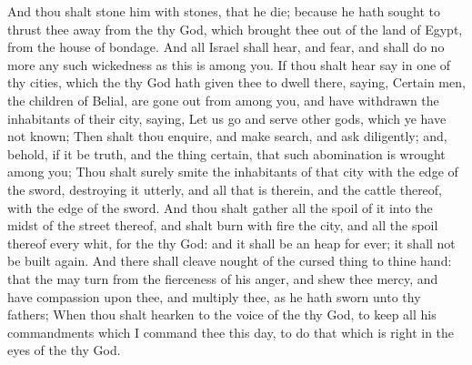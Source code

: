 \begin{biblechapter}
\verse And thou shalt stone him with stones, that he die; because he hath sought to thrust thee away from the \LORD thy God, which brought thee out of the land of Egypt, from the house of bondage.
\verse And all Israel shall hear, and fear, and shall do no more any such wickedness as this is among you.
\verse If thou shalt hear say in one of thy cities, which the \LORD thy God hath given thee to dwell there, saying,
\verse Certain men, the children of Belial, are gone out from among you, and have withdrawn the inhabitants of their city, saying, Let us go and serve other gods, which ye have not known;
\verse Then shalt thou enquire, and make search, and ask diligently; and, behold, if it be truth, and the thing certain, that such abomination is wrought among you;
\verse Thou shalt surely smite the inhabitants of that city with the edge of the sword, destroying it utterly, and all that is therein, and the cattle thereof, with the edge of the sword.
\verse And thou shalt gather all the spoil of it into the midst of the street thereof, and shalt burn with fire the city, and all the spoil thereof every whit, for the \LORD thy God: and it shall be an heap for ever; it shall not be built again.
\verse And there shall cleave nought of the cursed thing to thine hand: that the \LORD may turn from the fierceness of his anger, and shew thee mercy, and have compassion upon thee, and multiply thee, as he hath sworn unto thy fathers;
\verse When thou shalt hearken to the voice of the \LORD thy God, to keep all his commandments which I command thee this day, to do that which is right in the eyes of the \LORD thy God.
\end{biblechapter}

